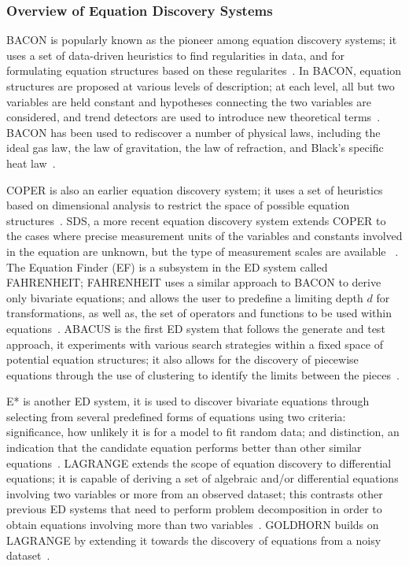 \documentclass[13pt]{report}
\begin{document}
\subsubsection{Overview of Equation Discovery Systems}
BACON is popularly known as the pioneer among equation discovery systems; it uses a set of data-driven heuristics to find regularities in data, and for formulating equation structures based on these regularites~\cite{sammut2011encyclopedia}. In BACON, equation structures are proposed at various levels of description; at each level, all but two variables are held constant and hypotheses connecting the two variables are considered, and trend detectors are used to introduce new theoretical terms~\cite{fielding1999machine}. BACON has been used to rediscover a number of physical laws, including the ideal gas law, the law of gravitation, the law of refraction, and Black's specific heat law~\cite{fielding1999machine}.\par
COPER is also an earlier equation discovery system; it uses a set of heuristics based on dimensional analysis to restrict the space of possible equation structures~\cite{sammut2011encyclopedia}. SDS, a more recent equation discovery system extends COPER to the cases where precise measurement units  of the variables and constants involved in the equation are unknown, but the type of measurement scales are available ~\cite{sammut2011encyclopedia}. The Equation Finder (EF) is a subsystem in the ED system called FAHRENHEIT; FAHRENHEIT uses a similar approach to BACON to derive only bivariate equations; and allows the user to predefine a limiting depth $d$ for transformations, as well as, the set of operators and functions to be used within equations~\cite{fielding1999machine, equationdiscintro}. ABACUS is the first ED system that follows the generate and test approach, it experiments with various search strategies within a fixed space of potential equation structures; it also allows for the discovery of piecewise equations through the use of clustering to identify the limits between the pieces~\cite{sammut2011encyclopedia,equationdiscintro}.\par

E* is another ED system, it is used to discover bivariate equations through selecting from several predefined forms of equations using two criteria: significance, how unlikely it is for a model to fit random data; and distinction, an indication that the candidate equation performs better than other similar equations~\cite{fielding1999machine, equationdiscintro}. LAGRANGE extends the scope of equation discovery to differential equations; it is capable of deriving a set of algebraic and/or differential equations involving two variables or more from an observed dataset; this contrasts other previous ED systems that need to perform problem decomposition in order to obtain equations involving more than two variables~\cite{fielding1999machine}. GOLDHORN builds on LAGRANGE by extending it towards the discovery of equations from a noisy dataset~\cite{equationdiscintro}.
\end{document}
